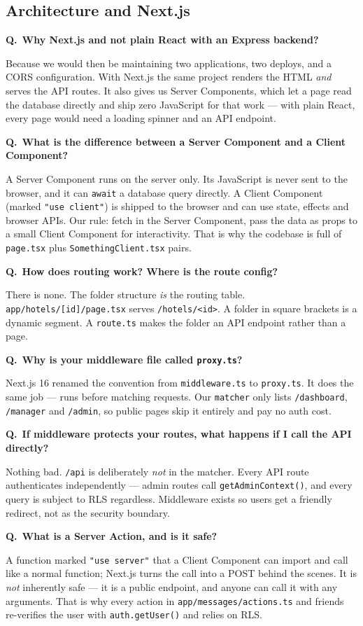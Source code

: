 \documentclass[11pt,a4paper]{article}
\newcommand{\Q}[1]{\vspace{7pt}\noindent\textbf{\color{primary}Q.}~\textbf{#1}\par\vspace{1pt}}
\newcommand{\A}[1]{\noindent #1\par}
\newcommand{\file}[1]{\texttt{\small #1}}
\begin{document}
\subsection{Architecture and Next.js}

\Q{Why Next.js and not plain React with an Express backend?}
\A{Because we would then be maintaining two applications, two deploys, and a CORS
configuration. With Next.js the same project renders the HTML \emph{and} serves
the API routes. It also gives us Server Components, which let a page read the
database directly and ship zero JavaScript for that work --- with plain React,
every page would need a loading spinner and an API endpoint.}

\Q{What is the difference between a Server Component and a Client Component?}
\A{A Server Component runs on the server only. Its JavaScript is never sent to the
browser, and it can \texttt{await} a database query directly. A Client Component
(marked \texttt{"use client"}) is shipped to the browser and can use state,
effects and browser APIs. Our rule: fetch in the Server Component, pass the data
as props to a small Client Component for interactivity. That is why the codebase
is full of \texttt{page.tsx} plus \texttt{SomethingClient.tsx} pairs.}

\Q{How does routing work? Where is the route config?}
\A{There is none. The folder structure \emph{is} the routing table.
\file{app/hotels/[id]/page.tsx} serves \texttt{/hotels/<id>}. A folder in square
brackets is a dynamic segment. A \file{route.ts} makes the folder an API endpoint
rather than a page.}

\Q{Why is your middleware file called \file{proxy.ts}?}
\A{Next.js 16 renamed the convention from \file{middleware.ts} to \file{proxy.ts}.
It does the same job --- runs before matching requests. Our \texttt{matcher} only
lists \texttt{/dashboard}, \texttt{/manager} and \texttt{/admin}, so public pages
skip it entirely and pay no auth cost.}

\Q{If middleware protects your routes, what happens if I call the API directly?}
\A{Nothing bad. \texttt{/api} is deliberately \emph{not} in the matcher. Every API
route authenticates independently --- admin routes call \texttt{getAdminContext()},
and every query is subject to RLS regardless. Middleware exists so users get a
friendly redirect, not as the security boundary.}

\Q{What is a Server Action, and is it safe?}
\A{A function marked \texttt{"use server"} that a Client Component can import and
call like a normal function; Next.js turns the call into a POST behind the scenes.
It is \emph{not} inherently safe --- it is a public endpoint, and anyone can call
it with any arguments. That is why every action in \file{app/messages/actions.ts}
and friends re-verifies the user with \texttt{auth.getUser()} and relies on RLS.}
\end{document}
